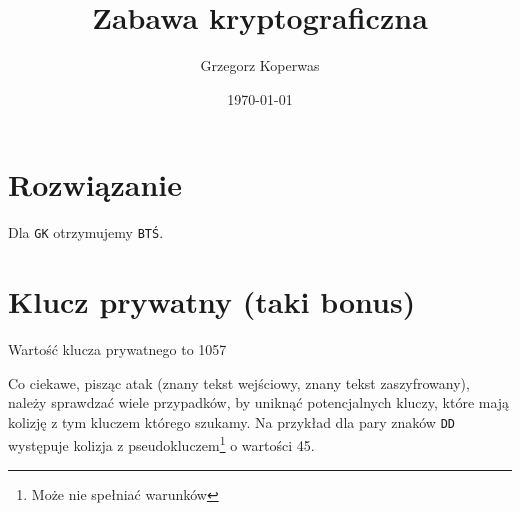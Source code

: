 \documentclass[a4paper,12pt]{article}
\title{Zabawa kryptograficzna}
\author{Grzegorz Koperwas}
\date{\today}
\begin{document}
\maketitle
\thispagestyle{fancy}

\section*{Rozwiązanie}

Dla \texttt{GK} otrzymujemy \texttt{BTŚ}.

\section*{Klucz prywatny (taki bonus)}

Wartość klucza prywatnego to 1057

Co ciekawe, pisząc atak (znany tekst wejściowy, znany tekst zaszyfrowany), należy sprawdzać wiele przypadków, by uniknąć potencjalnych kluczy, które mają kolizję z tym kluczem którego szukamy. Na przykład dla pary znaków \texttt{DD} występuje kolizja z pseudokluczem\footnote{Może nie spełniać warunków} o wartości 45.
\end{document}
